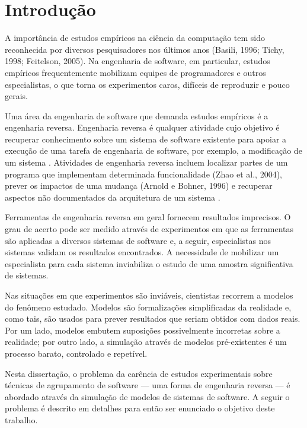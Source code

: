 %

\chapter{Introdução}

A importância de estudos empíricos na ciência da computação tem sido reconhecida por diversos pesquisadores nos últimos anos (Basili, 1996; Tichy, 1998; Feitelson, 2005). Na engenharia de software, em particular, estudos empíricos frequentemente mobilizam equipes de programadores e outros especialistas, o que torna os experimentos caros, difíceis de reproduzir e pouco gerais.

Uma área da engenharia de software que demanda estudos empíricos é a engenharia reversa. Engenharia reversa é qualquer atividade cujo objetivo é recuperar conhecimento sobre um sistema de software existente para apoiar a execução de uma tarefa de engenharia de software, por exemplo, a modificação de um sistema \cite{Tonella2007}. Atividades de engenharia reversa incluem localizar partes de um programa que implementam determinada funcionalidade (Zhao et al., 2004), prever os impactos de uma mudança (Arnold e Bohner, 1996) e recuperar aspectos não documentados da arquitetura de um sistema \cite{Pollet2007}.

Ferramentas de engenharia reversa em geral fornecem resultados imprecisos. O grau de acerto pode ser medido através de experimentos em que as ferramentas são aplicadas a diversos sistemas de software e, a seguir, especialistas nos sistemas validam os resultados encontrados. A necessidade de mobilizar um especialista para cada sistema inviabiliza o estudo de uma amostra significativa de sistemas.

Nas situações em que experimentos são inviáveis, cientistas recorrem a modelos do fenômeno estudado. Modelos são formalizações simplificadas da realidade e, como tais, são usados para prever resultados que seriam obtidos com dados reais. Por um lado, modelos embutem suposições possivelmente incorretas sobre a realidade; por outro lado, a simulação através de modelos pré-existentes é um processo barato, controlado e repetível.

Nesta dissertação, o problema da carência de estudos experimentais sobre técnicas de agrupamento de software --- uma forma de engenharia reversa --- é abordado através da simulação de modelos de sistemas de software. A seguir o problema é descrito em detalhes para então ser enunciado o objetivo deste trabalho.

